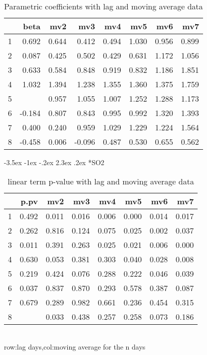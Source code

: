 \documentclass[a4paper, 12pt]{article}
\makeatletter
\def\large{\fontsize{14}{20}\selectfont}
\renewcommand\subsection{\@startsection {subsection}{1}{\z@}%
                                   {-3.5ex \@plus -1ex \@minus -.2ex}%
                                   {2.3ex \@plus.2ex}%
                                   {\centering\normalfont\large\bfseries}}
\makeatother
\begin{document}
\begin{table}[h]
\centering
\caption{Parametric coefficients with lag and moving average data}
\begin{tabular}{rrrrrrrr}
  \hline
 & beta & mv2 & mv3 & mv4 & mv5 & mv6 & mv7 \\
  \hline
1 & 0.692 & 0.644 & 0.412 & 0.494 & 1.030 & 0.956 & 0.899 \\
  2 & 0.087 & 0.425 & 0.502 & 0.429 & 0.631 & 1.172 & 1.056 \\
  3 & 0.633 & 0.584 & 0.848 & 0.919 & 0.832 & 1.186 & 1.851 \\
  4 & 1.032 & 1.394 & 1.238 & 1.355 & 1.360 & 1.375 & 1.759 \\
  5 & \color{red}{1.050} & 0.957 & 1.055 & 1.007 & 1.252 & 1.288 & 1.173 \\
  6 & -0.184 & 0.807 & 0.843 & 0.995 & 0.992 & 1.320 & 1.393 \\
  7 & 0.400 & 0.240 & 0.959 & 1.029 & 1.229 & 1.224 & 1.564 \\
  8 & -0.458 & 0.006 & -0.096 & 0.487 & 0.530 & 0.655 & 0.562 \\
   \hline
\end{tabular}
\end{table}
\clearpage
\subsection*{SO2}
\begin{table}[h]
\centering
\caption{linear term p-value with lag and moving average data}
\begin{tabular}{rrrrrrrr}
  \hline
 & p.pv & mv2 & mv3 & mv4 & mv5 & mv6 & mv7 \\
  \hline
1 & 0.492 & 0.011 & 0.016 & 0.006 & 0.000 & 0.014 & 0.017 \\
  2 & 0.262 & 0.816 & 0.124 & 0.075 & 0.025 & 0.002 & 0.037 \\
  3 & 0.011 & 0.391 & 0.263 & 0.025 & 0.021 & 0.006 & 0.000 \\
  4 & 0.630 & 0.053 & 0.381 & 0.303 & 0.040 & 0.028 & 0.008 \\
  5 & 0.219 & 0.424 & 0.076 & 0.288 & 0.222 & 0.046 & 0.039 \\
  6 & 0.037 & 0.837 & 0.870 & 0.293 & 0.578 & 0.387 & 0.087 \\
  7 & 0.679 & 0.289 & 0.982 & 0.661 & 0.236 & 0.454 & 0.315 \\
  8 & \color{red}{0.004} & 0.033 & 0.438 & 0.257 & 0.258 & 0.073 & 0.186 \\
   \hline
\end{tabular}
\\row:lag days,col:moving average for the n days
\end{table}
\end{document}
